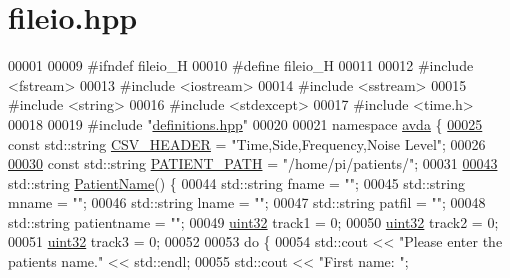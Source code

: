 \hypertarget{fileio_8hpp_source}{\section{fileio.\+hpp}
\label{fileio_8hpp_source}
}

\begin{DoxyCode}
00001 
00009 \textcolor{preprocessor}{#ifndef fileio\_H}
00010 \textcolor{preprocessor}{#define fileio\_H}
00011 
00012 \textcolor{preprocessor}{#include <fstream>}
00013 \textcolor{preprocessor}{#include <iostream>}
00014 \textcolor{preprocessor}{#include <sstream>}
00015 \textcolor{preprocessor}{#include <string>}
00016 \textcolor{preprocessor}{#include <stdexcept>}
00017 \textcolor{preprocessor}{#include <time.h>}
00018 
00019 \textcolor{preprocessor}{#include "\hyperlink{definitions_8hpp}{definitions.hpp}"}
00020 
00021 \textcolor{keyword}{namespace }\hyperlink{namespaceavda}{avda} \{
\hypertarget{fileio_8hpp_source_l00025}{}\hyperlink{namespaceavda_ac568a0872c2c176d874b8b12f67f43ea}{00025}     \textcolor{keyword}{const} std::string \hyperlink{namespaceavda_ac568a0872c2c176d874b8b12f67f43ea}{CSV\_HEADER} = \textcolor{stringliteral}{"Time,Side,Frequency,Noise Level"};
00026 
\hypertarget{fileio_8hpp_source_l00030}{}\hyperlink{namespaceavda_a8ee73ec0cb55d4a13e89949764dce89d}{00030}     \textcolor{keyword}{const} std::string \hyperlink{namespaceavda_a8ee73ec0cb55d4a13e89949764dce89d}{PATIENT\_PATH} = \textcolor{stringliteral}{"/home/pi/patients/"};
00031 
\hypertarget{fileio_8hpp_source_l00043}{}\hyperlink{namespaceavda_ae20728e7e8ae50bf2f74849e538841ea}{00043}     std::string \hyperlink{namespaceavda_ae20728e7e8ae50bf2f74849e538841ea}{PatientName}() \{
00044         std::string fname = \textcolor{stringliteral}{""};
00045         std::string mname = \textcolor{stringliteral}{""};
00046         std::string lname = \textcolor{stringliteral}{""};
00047         std::string patfil = \textcolor{stringliteral}{""};
00048         std::string patientname = \textcolor{stringliteral}{""};
00049         \hyperlink{definitions_8hpp_a1134b580f8da4de94ca6b1de4d37975e}{uint32} track1 = 0;
00050         \hyperlink{definitions_8hpp_a1134b580f8da4de94ca6b1de4d37975e}{uint32} track2 = 0;
00051         \hyperlink{definitions_8hpp_a1134b580f8da4de94ca6b1de4d37975e}{uint32} track3 = 0;
00052 
00053         \textcolor{keywordflow}{do} \{
00054             std::cout << \textcolor{stringliteral}{"Please enter the patients name."} << std::endl;
00055             std::cout << \textcolor{stringliteral}{"First name: "};

\end{DoxyCode}
